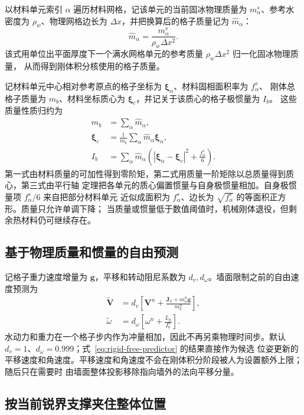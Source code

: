 \documentclass[UTF8,zihao=-4]{ctexart}
\newcommand{\vect}[1]{\boldsymbol{#1}}
\numberwithin{equation}{section}
\begin{document}
以材料单元索引 $\alpha$ 遍历材料网格，记该单元的当前固冰物理质量为 $m_\alpha^s$、参考水密度为
$\rho_w$、物理网格边长为 $\Delta x$，并把换算后的格子质量记为 $\widehat m_\alpha$：
\begin{equation}
  \widehat m_\alpha=\frac{m_\alpha^s}{\rho_w\Delta x^2}.
\end{equation}
该式用单位出平面厚度下一个满水网格单元的参考质量 $\rho_w\Delta x^2$ 归一化固冰物理质量，
从而得到刚体积分核使用的格子质量。

记材料单元中心相对参考原点的格子坐标为 $\vect\xi_\alpha$、材料固相面积率为 $f_\alpha^s$、
刚体总格子质量为 $m_b$、材料坐标质心为 $\vect\xi_c$，并记关于该质心的格子极惯量为 $I_b$。
这些质量性质归约为
\begin{align}
  m_b&=\sum_\alpha\widehat m_\alpha,\\
  \vect\xi_c&=\frac1{m_b}\sum_\alpha\widehat m_\alpha\vect\xi_\alpha,\\
  I_b&=\sum_\alpha\widehat m_\alpha
  \left(|\vect\xi_\alpha-\vect\xi_c|^2+\frac{f_\alpha^s}{6}\right).
  \label{eq:body-mass-moments}
\end{align}
第一式由材料质量的可加性得到零阶矩，第二式用质量一阶矩除以总质量得到质心，第三式由平行轴
定理把各单元的质心偏置惯量与自身极惯量相加。自身极惯量项 $f_\alpha^s/6$ 来自把部分材料单元
近似成面积为 $f_\alpha^s$、边长为 $\sqrt{f_\alpha^s}$ 的等面积正方形。质量只允许单调下降；
当质量或惯量低于数值阈值时，机械刚体退役，但剩余热材料仍可继续存在。

\subsection{基于物理质量和惯量的自由预测}

记格子重力速度增量为 $\vect g$，平移和转动阻尼系数为 $d_v,d_\omega$。墙面限制之前的自由速度预测为
\begin{align}
  \widetilde{\vect V}&=d_v\left[\vect V^n+
  \frac{\vect J_h+m_b^n\vect g}{m_b^n}\right],\\
  \widetilde\omega&=d_\omega\left[\omega^n+
  \frac{L_h}{I_b^n}\right].
  \label{eq:rigid-free-predictor}
\end{align}
水动力和重力在一个格子步内作为冲量相加，因此不再另乘物理时间步。默认
$d_v=1$、$d_\omega=0.999$；式~\eqref{eq:rigid-free-predictor} 的结果直接作为候选
位姿更新的平移速度和角速度。平移速度和角速度不会在刚体积分阶段被人为设置额外上限；随后只在需要时
由墙面整体投影移除指向墙外的法向平移分量。

\subsection{按当前锐界支撑夹住整体位置}
\end{document}
